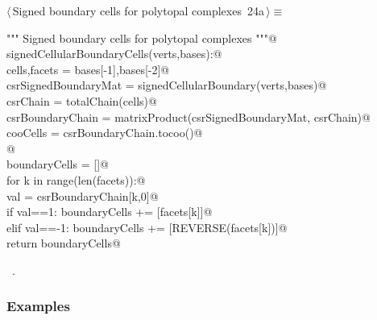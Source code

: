 \documentclass[11pt,oneside]{article}	%
\begin{document}
\begin{flushleft} \small \label{scrap41}
\protect{}$\langle\,$Signed boundary cells for polytopal complexes\nobreak\ {\footnotesize 24a}$\,\rangle\equiv$
\vspace{-1ex}
\begin{list}{}{} \item
\mbox{}\verb@""" Signed boundary cells for polytopal complexes """@\\
\mbox{}\verb@def signedCellularBoundaryCells(verts,bases):@\\
\mbox{}\verb@   cells,facets = bases[-1],bases[-2]@\\
\mbox{}\verb@   csrSignedBoundaryMat = signedCellularBoundary(verts,bases)@\\
\mbox{}\verb@   csrChain = totalChain(cells)@\\
\mbox{}\verb@   csrBoundaryChain = matrixProduct(csrSignedBoundaryMat, csrChain)@\\
\mbox{}\verb@   cooCells = csrBoundaryChain.tocoo()@\\
\mbox{}\verb@   @\\
\mbox{}\verb@   boundaryCells = []@\\
\mbox{}\verb@   for k in range(len(facets)):@\\
\mbox{}\verb@      val = csrBoundaryChain[k,0]@\\
\mbox{}\verb@      if val==1: boundaryCells += [facets[k]]@\\
\mbox{}\verb@      elif val==-1: boundaryCells += [REVERSE(facets[k])]@\\
\mbox{}\verb@   return boundaryCells@\\
\mbox{}\verb@@{\NWsep}
\end{list}
\vspace{-1ex}
\footnotesize\addtolength{\baselineskip}{-1ex}
\begin{list}{}{\setlength{\itemsep}{-\parsep}\setlength{\itemindent}{-\leftmargin}}
\item \NWtxtMacroRefIn\ .
\end{list}
\end{flushleft}

\subsubsection{Examples}
\end{document}
